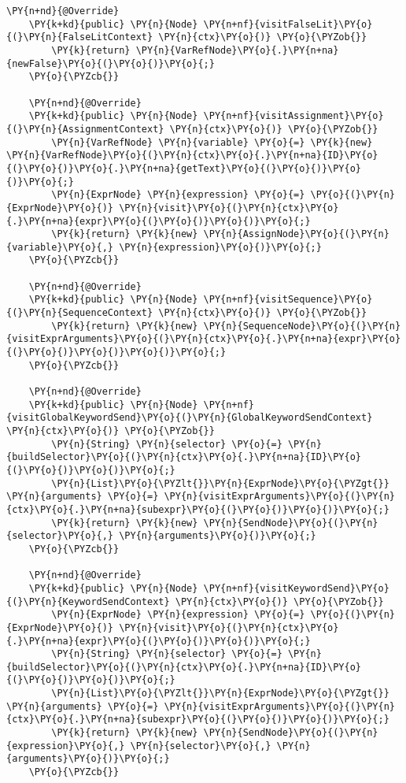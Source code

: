 \begin{Verbatim}[commandchars=\\\{\}]
    \PY{n+nd}{@Override}
    \PY{k+kd}{public} \PY{n}{Node} \PY{n+nf}{visitFalseLit}\PY{o}{(}\PY{n}{FalseLitContext} \PY{n}{ctx}\PY{o}{)} \PY{o}{\PYZob{}}
        \PY{k}{return} \PY{n}{VarRefNode}\PY{o}{.}\PY{n+na}{newFalse}\PY{o}{(}\PY{o}{)}\PY{o}{;}
    \PY{o}{\PYZcb{}}

    \PY{n+nd}{@Override}
    \PY{k+kd}{public} \PY{n}{Node} \PY{n+nf}{visitAssignment}\PY{o}{(}\PY{n}{AssignmentContext} \PY{n}{ctx}\PY{o}{)} \PY{o}{\PYZob{}}
        \PY{n}{VarRefNode} \PY{n}{variable} \PY{o}{=} \PY{k}{new} \PY{n}{VarRefNode}\PY{o}{(}\PY{n}{ctx}\PY{o}{.}\PY{n+na}{ID}\PY{o}{(}\PY{o}{)}\PY{o}{.}\PY{n+na}{getText}\PY{o}{(}\PY{o}{)}\PY{o}{)}\PY{o}{;}
        \PY{n}{ExprNode} \PY{n}{expression} \PY{o}{=} \PY{o}{(}\PY{n}{ExprNode}\PY{o}{)} \PY{n}{visit}\PY{o}{(}\PY{n}{ctx}\PY{o}{.}\PY{n+na}{expr}\PY{o}{(}\PY{o}{)}\PY{o}{)}\PY{o}{;}
        \PY{k}{return} \PY{k}{new} \PY{n}{AssignNode}\PY{o}{(}\PY{n}{variable}\PY{o}{,} \PY{n}{expression}\PY{o}{)}\PY{o}{;}
    \PY{o}{\PYZcb{}}

    \PY{n+nd}{@Override}
    \PY{k+kd}{public} \PY{n}{Node} \PY{n+nf}{visitSequence}\PY{o}{(}\PY{n}{SequenceContext} \PY{n}{ctx}\PY{o}{)} \PY{o}{\PYZob{}}
        \PY{k}{return} \PY{k}{new} \PY{n}{SequenceNode}\PY{o}{(}\PY{n}{visitExprArguments}\PY{o}{(}\PY{n}{ctx}\PY{o}{.}\PY{n+na}{expr}\PY{o}{(}\PY{o}{)}\PY{o}{)}\PY{o}{)}\PY{o}{;}
    \PY{o}{\PYZcb{}}

    \PY{n+nd}{@Override}
    \PY{k+kd}{public} \PY{n}{Node} \PY{n+nf}{visitGlobalKeywordSend}\PY{o}{(}\PY{n}{GlobalKeywordSendContext} \PY{n}{ctx}\PY{o}{)} \PY{o}{\PYZob{}}
        \PY{n}{String} \PY{n}{selector} \PY{o}{=} \PY{n}{buildSelector}\PY{o}{(}\PY{n}{ctx}\PY{o}{.}\PY{n+na}{ID}\PY{o}{(}\PY{o}{)}\PY{o}{)}\PY{o}{;}
        \PY{n}{List}\PY{o}{\PYZlt{}}\PY{n}{ExprNode}\PY{o}{\PYZgt{}} \PY{n}{arguments} \PY{o}{=} \PY{n}{visitExprArguments}\PY{o}{(}\PY{n}{ctx}\PY{o}{.}\PY{n+na}{subexpr}\PY{o}{(}\PY{o}{)}\PY{o}{)}\PY{o}{;}
        \PY{k}{return} \PY{k}{new} \PY{n}{SendNode}\PY{o}{(}\PY{n}{selector}\PY{o}{,} \PY{n}{arguments}\PY{o}{)}\PY{o}{;}
    \PY{o}{\PYZcb{}}

    \PY{n+nd}{@Override}
    \PY{k+kd}{public} \PY{n}{Node} \PY{n+nf}{visitKeywordSend}\PY{o}{(}\PY{n}{KeywordSendContext} \PY{n}{ctx}\PY{o}{)} \PY{o}{\PYZob{}}
        \PY{n}{ExprNode} \PY{n}{expression} \PY{o}{=} \PY{o}{(}\PY{n}{ExprNode}\PY{o}{)} \PY{n}{visit}\PY{o}{(}\PY{n}{ctx}\PY{o}{.}\PY{n+na}{expr}\PY{o}{(}\PY{o}{)}\PY{o}{)}\PY{o}{;}
        \PY{n}{String} \PY{n}{selector} \PY{o}{=} \PY{n}{buildSelector}\PY{o}{(}\PY{n}{ctx}\PY{o}{.}\PY{n+na}{ID}\PY{o}{(}\PY{o}{)}\PY{o}{)}\PY{o}{;}
        \PY{n}{List}\PY{o}{\PYZlt{}}\PY{n}{ExprNode}\PY{o}{\PYZgt{}} \PY{n}{arguments} \PY{o}{=} \PY{n}{visitExprArguments}\PY{o}{(}\PY{n}{ctx}\PY{o}{.}\PY{n+na}{subexpr}\PY{o}{(}\PY{o}{)}\PY{o}{)}\PY{o}{;}
        \PY{k}{return} \PY{k}{new} \PY{n}{SendNode}\PY{o}{(}\PY{n}{expression}\PY{o}{,} \PY{n}{selector}\PY{o}{,} \PY{n}{arguments}\PY{o}{)}\PY{o}{;}
    \PY{o}{\PYZcb{}}


\end{Verbatim}
